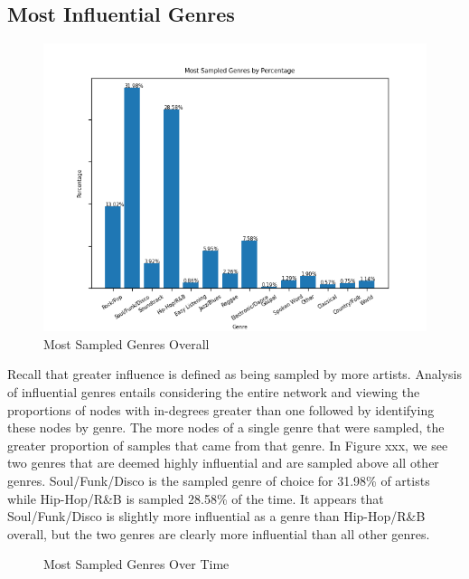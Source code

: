 \documentclass[pageno]{jpaper}
\begin{document}
\subsection{Most Influential Genres}
\begin{figure}[H]
\includegraphics{topSampledGenresPercent}
\caption{Most Sampled Genres Overall}
\centering
\end{figure}
Recall that greater influence is defined as being sampled by more artists. Analysis of influential genres entails considering the entire network and viewing the proportions of nodes with in-degrees greater than one followed by identifying these nodes by genre. The more nodes of a single genre that were sampled, the greater proportion of samples that came from that genre. In Figure xxx, we see two genres that are deemed highly influential and are sampled above all other genres. Soul/Funk/Disco is the sampled genre of choice for 31.98\% of artists while Hip-Hop/R\&B is sampled 28.58\% of the time. It appears that Soul/Funk/Disco is slightly more influential as a genre than Hip-Hop/R\&B overall, but the two genres are clearly more influential than all other genres.
\begin{figure}[H]
\caption{Most Sampled Genres Over Time}
\centering
\end{figure}
\end{document}
